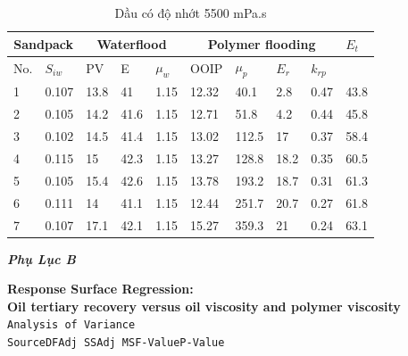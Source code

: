 \documentclass[12pt,a4paper]{article}
\newcommand{\code}[1]{\texttt{#1}}
\begin{document}
\begin{table}[h]
\centering
\caption{Dầu có độ nhớt 5500 mPa.s}
\label{my-label}
\begin{tabularx}{\textwidth}{@{}XX|XXX|XXXX|X@{}}
\toprule
\multicolumn{2}{c}{Sandpack} & \multicolumn{3}{c}{Waterflood} & \multicolumn{4}{c}{Polymer flooding} & $E_t$ \\ \midrule
No.        & $S_{iw}$        & PV      & E    & $\mu_w$   & OOIP   & $\mu_p$  & $E_r$ & $k_{rp}$ &       \\
1          & 0.107           & 13.8    & 41       & 1.15      & 12.32  & 40.1     & 2.8   & 0.47     & 43.8  \\
2          & 0.105           & 14.2    & 41.6     & 1.15      & 12.71  & 51.8     & 4.2   & 0.44     & 45.8  \\
3          & 0.102           & 14.5    & 41.4     & 1.15      & 13.02  & 112.5    & 17    & 0.37     & 58.4  \\
4          & 0.115           & 15      & 42.3     & 1.15      & 13.27  & 128.8    & 18.2  & 0.35      & 60.5  \\
5          & 0.105           & 15.4    & 42.6     & 1.15      & 13.78  & 193.2    & 18.7  & 0.31     & 61.3  \\
6          & 0.111           & 14      & 41.1     & 1.15      & 12.44  & 251.7    & 20.7  & 0.27     & 61.8  \\
7          & 0.107           & 17.1    & 42.1     & 1.15      & 15.27  & 359.3    & 21    & 0.24     & 63.1  \\ \bottomrule
\end{tabularx}
\end{table}
\clearpage
\noindent
\textit{\textbf{\LARGE Phụ Lục B}}\\
\noindent
\textbf{Response Surface Regression:\\
Oil tertiary recovery versus oil viscosity and polymer viscosity}\\
\newline
\code{Analysis of Variance}\\
\newline
\code{Source}\hspace*{3cm}\code{DF}\hspace*{1cm}\code{Adj SS}\hspace*{1cm}\code{Adj MS}\hspace*{1cm}\code{F-Value}\hspace*{1cm}\code{P-Value}\\
\end{document}
